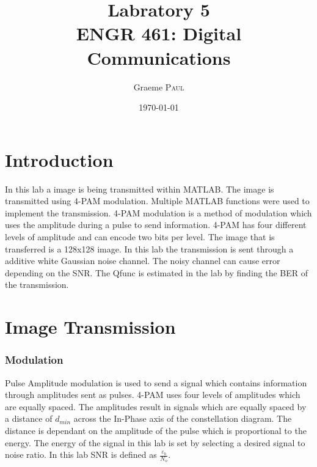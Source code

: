 \documentclass{article}
\title{Labratory 5\\ ENGR 461: Digital Communications} %
\author{Graeme \textsc{Paul}} %
\date{\today} %
\begin{document}
\maketitle
\section{Introduction}
In this lab a image is being transmitted within MATLAB. The image is transmitted using 4-PAM modulation. Multiple MATLAB functions were used to implement the transmission. 4-PAM modulation is a method of modulation which uses the amplitude during a pulse to send information. 4-PAM has four different levels of amplitude and can encode two bits per level. The image that is transferred is a 128x128 image. In this lab the transmission is sent through a additive white Gaussian noise channel. The noisy channel can cause error depending on the SNR. The Qfunc is estimated in the lab by finding the BER of the transmission. 
\section{Image Transmission}
\subsubsection{Modulation}
Pulse Amplitude modulation is used to send a signal which contains information through amplitudes sent as pulses. 4-PAM uses four levels of amplitudes which are equally spaced. The amplitudes result in signals which are equally spaced by a distance of $d_{min}$ across the In-Phase axis of the constellation diagram. The distance is dependant on the amplitude of the pulse which is proportional to the energy. The energy of the signal in this lab is set by selecting a desired signal to noise ratio. In this lab SNR is defined as $\frac{\varepsilon_b}{N_o}$.
\end{document}
